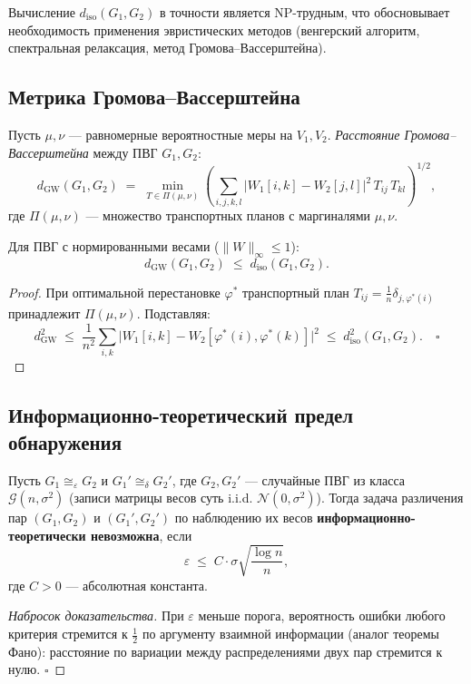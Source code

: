 \begin{corollary}
Вычисление $d_{\mathrm{iso}}(G_1, G_2)$ в точности является NP-трудным,
что обосновывает необходимость применения эвристических методов
(венгерский алгоритм, спектральная релаксация, метод Громова–Вассерштейна).
\end{corollary}

\subsection{Метрика Громова–Вассерштейна}

\begin{definition}
Пусть $\mu, \nu$ — равномерные вероятностные меры на $V_1, V_2$.
\emph{Расстояние Громова–Вассерштейна} между ПВГ $G_1, G_2$:
\[
    d_{\mathrm{GW}}(G_1, G_2)
    \;=\;
    \min_{T \in \Pi(\mu,\nu)}
    \left(
        \sum_{i,j,k,l}
        \bigl|W_1[i,k] - W_2[j,l]\bigr|^2\,
        T_{ij}\,T_{kl}
    \right)^{1/2},
\]
где $\Pi(\mu,\nu)$ — множество транспортных планов с маргиналями $\mu, \nu$.
\end{definition}

\begin{theorem}
\label{thm:gw_relation}
Для ПВГ с нормированными весами ($\|W\|_\infty \le 1$):
\[
    d_{\mathrm{GW}}(G_1, G_2) \;\le\; d_{\mathrm{iso}}(G_1, G_2).
\]
\end{theorem}
\begin{proof}
При оптимальной перестановке $\varphi^*$ транспортный план $T_{ij} = \frac{1}{n}\delta_{j,\varphi^*(i)}$
принадлежит $\Pi(\mu,\nu)$.
Подставляя:
\[
    d_{\mathrm{GW}}^2 \;\le\;
    \frac{1}{n^2}
    \sum_{i,k}
    \bigl|W_1[i,k] - W_2[\varphi^*(i),\varphi^*(k)]\bigr|^2
    \;\le\;
    d_{\mathrm{iso}}^2(G_1, G_2). \quad\square
\]
\end{proof}

\subsection{Информационно-теоретический предел обнаружения}

\begin{theorem}
\label{thm:info_limit}
Пусть $G_1 \cong_\varepsilon G_2$ и $G_1' \cong_\delta G_2'$,
где $G_2, G_2'$ — случайные ПВГ из класса $\mathcal{G}(n, \sigma^2)$
(записи матрицы весов суть i.i.d. $\mathcal{N}(0, \sigma^2)$).
Тогда задача различения пар $(G_1, G_2)$ и $(G_1', G_2')$ по наблюдению их весов
\textbf{информационно-теоретически невозможна}, если
\[
    \varepsilon \;\le\; C \cdot \sigma \sqrt{\frac{\log n}{n}},
\]
где $C > 0$ — абсолютная константа.
\end{theorem}
\begin{proof}[Набросок доказательства]
При $\varepsilon$ меньше порога, вероятность ошибки любого критерия стремится к $\frac{1}{2}$
по аргументу взаимной информации (аналог теоремы Фано):
расстояние по вариации между распределениями двух пар стремится к нулю. $\square$
\end{proof}


